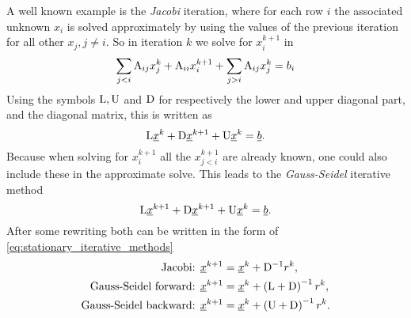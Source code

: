 A well known example is the
\emph{Jacobi} iteration, where for each row $i$ the associated unknown $x_i$
is solved approximately by using the values of the previous iteration
for all other $x_j, j\neq i$. So in iteration $k$ we solve for $x^{k+1}_i$ in
\begin{equation*}
  \sum_{j<i} \mathrm{A}_{ij} x^k_j + \mathrm{A}_{ii} x^{k+1}_i +
  \sum_{j>i} \mathrm{A}_{ij} x^k_j = b_i
\end{equation*}
Using the symbols $\mathrm{L}, \mathrm{U}$ and $\mathrm{D}$ for respectively
the lower and upper diagonal part, and the diagonal matrix,
this is written as
\begin{equation*}
  \mathrm{L} \underline{x}^k +
  \mathrm{D} \underline{x}^{k+1} +
  \mathrm{U} \underline{x}^k = \underline{b}.
\end{equation*}
Because when solving for $x^{k+1}_i$ all the $x^{k+1}_{j<i}$ are already
known, one could also include these in the approximate solve. This leads
to the \emph{Gauss-Seidel} iterative method
\begin{equation*}
  \mathrm{L} \underline{x}^{k+1} +
  \mathrm{D} \underline{x}^{k+1} +
  \mathrm{U} \underline{x}^k = \underline{b}.
\end{equation*}
After some rewriting both can be written in the form of
\eqref{eq:stationary_iterative_methods}
\begin{equation}
\begin{split}
  \text{Jacobi:   } & \underline{x}^{k+1}=\underline{x}^k + \mathrm{D}^{-1} r^k, \\
  \text{Gauss-Seidel forward:  } & \underline{x}^{k+1}=\underline{x}^k + \left(\mathrm{L}+\mathrm{D}\right)^{-1} r^k, \\
  \text{Gauss-Seidel backward: } & \underline{x}^{k+1}=\underline{x}^k + \left(\mathrm{U}+\mathrm{D}\right)^{-1} r^k.
\end{split}
\end{equation}

